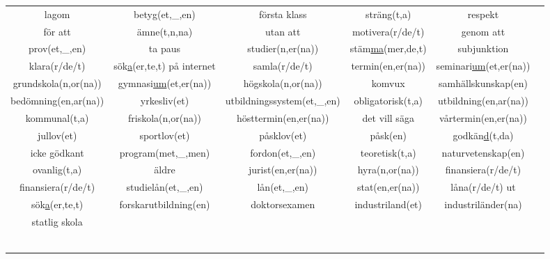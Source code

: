 
\begin{center}
    \begin{adjustwidth}{-2.5cm}{}
        \begin{tabular}{|c c c c c c|}
            \hline
            lagom & betyg(et,\_,en) & första klass & sträng(t,a) & respekt &  \\
            för att & ämne(t,n,na) & utan att & motivera(r/de/t) & genom att &  \\
            prov(et,\_,en) & ta paus & studier(n,er(na)) & stäm\underline{ma}(mer,de,t) & subjunktion &  \\
            klara(r/de/t) & sök\underline{a}(er,te,t) på internet & samla(r/de/t) & termin(en,er(na)) & seminari\underline{um}(et,er(na)) &  \\
            grundskola(n,or(na)) & gymnasi\underline{um}(et,er(na)) & högskola(n,or(na)) & komvux & samhällskunskap(en) &  \\
            bedömning(en,ar(na)) & yrkesliv(et) & utbildningssystem(et,\_,en) & obligatorisk(t,a) & utbildning(en,ar(na)) &  \\
            kommunal(t,a) & friskola(n,or(na)) & hösttermin(en,er(na)) & det vill säga & vårtermin(en,er(na)) &  \\
            jullov(et) & sportlov(et) & påsklov(et) & påsk(en) & godkän\underline{d}(t,da) &  \\
            icke gödkant & program(met,\_,men) & fordon(et,\_,en) & teoretisk(t,a) & naturvetenskap(en) &  \\
            ovanlig(t,a) & äldre & jurist(en,er(na)) & hyra(n,or(na)) & finansiera(r/de/t) &  \\
            finansiera(r/de/t) & studielån(et,\_,en) & lån(et,\_,en) & stat(en,er(na)) & låna(r/de/t) ut &  \\
            sök\underline{a}(er,te,t) & forskarutbildning(en) & doktorsexamen & industriland(et) & industriländer(na) &  \\
            statlig skola &  &  &  &  &  \\
             &  &  &  &  &  \\
             &  &  &  &  &  \\
             &  &  &  &  &  \\
             &  &  &  &  &  \\
             &  &  &  &  &  \\
             &  &  &  &  &  \\

\end{tabular}
\end{adjustwidth}
\end{center}

